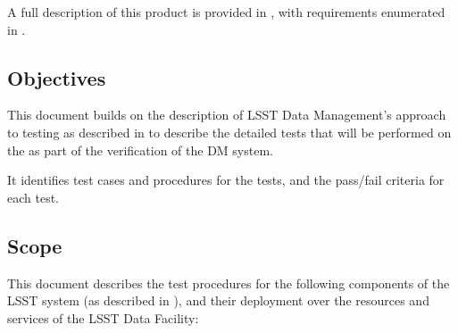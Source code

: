 \documentclass[DM,lsstdraft,STS,toc]{lsstdoc}
\begin{document}
A full description of this product is provided in , with requirements enumerated in .

\subsection{Objectives}
\label{sec:objectives}

This document builds on the description of LSST Data Management's approach to testing as described in  to describe the detailed tests that will be performed on the \product{} as part of the verification of the DM system.

It identifies test cases and procedures for the tests, and the pass/fail criteria for each test.

\subsection{Scope}
\label{sec:scope}

This document describes the test procedures for the following components of the LSST system (as described in ), and their deployment over the resources and services of the LSST Data Facility:
\end{document}

